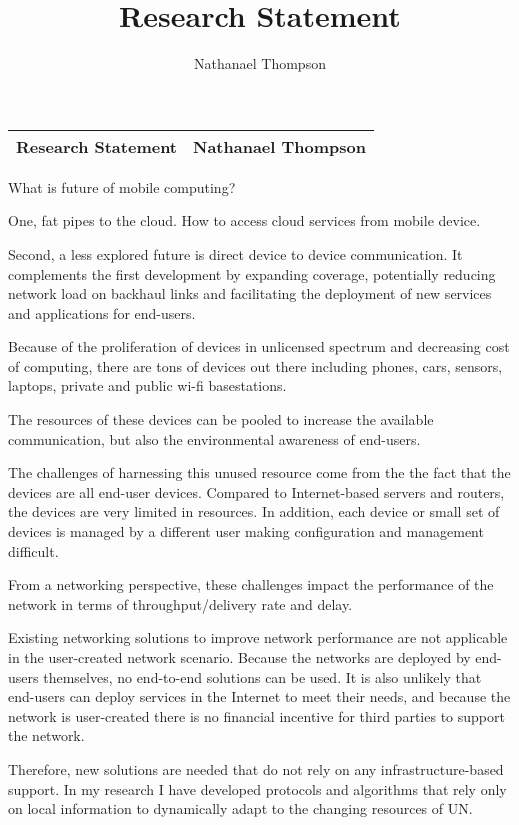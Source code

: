 \documentclass[10pt]{article}
\author{Nathanael Thompson}
\title{Research Statement}
\begin{document}
\begin{center}
\begin{tabular}{lr}
\textbf{\Large{Research Statement}} \hfill & \hfill \textbf{\Large{Nathanael Thompson}} \\
\hline
\end{tabular}
\end{center}

What is future of mobile computing?

One, fat pipes to the cloud.  How to access cloud services from mobile device.

Second, a less explored future is direct device to device communication.  It
complements the first development by expanding coverage, potentially reducing
network load on backhaul links and facilitating the deployment of new services
and applications for end-users.

Because of the proliferation of devices in unlicensed spectrum and decreasing
cost of computing, there are tons of devices out there including phones, cars,
sensors, laptops, private and public wi-fi basestations.

The resources of these devices can be pooled to increase the available
communication, but also the environmental awareness of end-users.

The challenges of harnessing this unused resource come from the the fact that
the devices are all end-user devices.  Compared to Internet-based servers and
routers, the devices are very limited in resources.  In addition, each device
or small set of devices is managed by a different user making configuration and
management difficult.

From a networking perspective, these challenges impact the performance of the
network in terms of throughput/delivery rate and delay.

Existing networking solutions to improve network performance are not applicable
in the user-created network scenario.  Because the networks are deployed by
end-users themselves, no end-to-end solutions can be used.  It is also unlikely
that end-users can deploy services in the Internet to meet their needs, and
because the network is user-created there is no financial incentive for third
parties to support the network.

Therefore, new solutions are needed that do not rely on any infrastructure-based
support.  In my research I have developed protocols and algorithms that rely
only on local information to dynamically adapt to the changing resources of UN.
\end{document}
